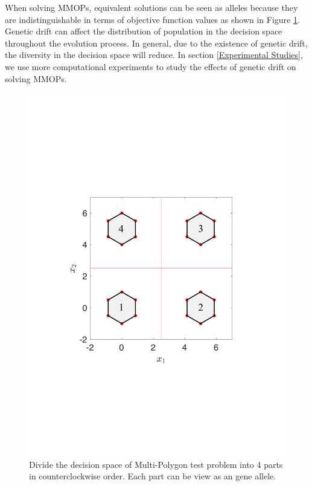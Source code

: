 \documentclass[conference]{IEEEtran}
\begin{document}
When solving MMOPs, equivalent solutions can be seen as alleles because they are indistinguishable in terms of objective function values as shown in Figure \ref{fig: Alleles}. Genetic drift can affect the distribution of population in the decision space throughout the evolution process. In general, due to the existence of genetic drift, the diversity in the decision space will reduce. In section \ref{Experimental Studies}, we use more computational experiments to study the effects of genetic drift on solving MMOPs.

\begin{figure}[htbp]
    \centering
    \includegraphics[width=.3\textwidth]{Section3/Alleles}
    \caption{Divide the decision space of Multi-Polygon test problem into 4 parts in counterclockwise order. Each part can be view as an gene allele.}
    \label{fig: Alleles}
\end{figure}
\end{document}
